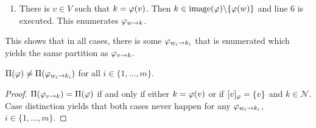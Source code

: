 \begin{\appendixproof}
\begin{enumerate}
\begin{enumerate}
\begin{enumerate}
                \item If $[w]_\idx = \{w,u\}$. 
                \begin{enumerate}
                    \item If $w < u$, then line \ref{alg:moveenum:l11} enumerates $\move{\idx}{w}{\ell}$ for $w$ and some $\ell \in \mathcal{N}$. But then $\Pi(\move{\idx}{w}{\ell}) = \Pi(\move{\idx}{w}{k})$.
                    \item If $u < w$, then line \ref{alg:moveenum:l11} enumerates $\move{\idx}{u}{\ell}$ for $u$ and some $\ell \in \mathcal{N}$. But then again, $\Pi(\move{\idx}{u}{\ell}) = \Pi(\move{\idx}{w}{k})$.
                \end{enumerate} 
            \end{enumerate}
            \item There is $v \in V$ such that $k = \varphi(v)$. Then $k \in \mathrm{image}(\varphi)\backslash \{ \varphi(w) \}$ and line 6 is executed. This enumerates $\varphi_{w\rightarrow k}$.
        \end{enumerate}
    \end{enumerate}
    This shows that in all cases, there is some $\varphi_{w_i\rightarrow k_i}$ that is enumerated which yields the same partition as $\varphi_{v\rightarrow k}$.
\end{\appendixproof}

\begin{lemma}
    $\Pi(\varphi) \neq \Pi(\varphi_{w_i\rightarrow k_i})$ for all $i\in \{1,\dots,m\}$. \label{lemma:self_neighbour}
\end{lemma}
\begin{proof}
    $\Pi(\varphi_{v\rightarrow k}) = \Pi(\varphi)$ if and only if either $k=\varphi(v)$ or if $[v]_\varphi = \{v\}$ and $k \in \mathcal{N}$. Case distinction yields that both cases never happen for any $\varphi_{w_i\rightarrow k_i}$, $i\in \{1,\dots,m\}$.
\end{proof}

